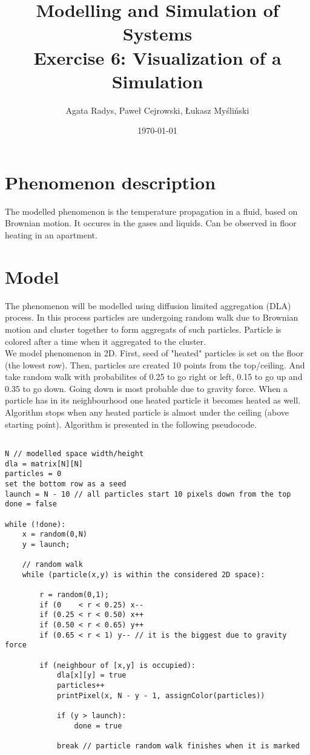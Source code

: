\documentclass[a4paper,10pt]{article}
\title{Modelling and Simulation of Systems\\ \Large
Exercise 6: Visualization of a Simulation}
\author{Agata Radys, Paweł Cejrowski, Łukasz Myśliński}
\date{\today}
\begin{document}
\maketitle

\section*{Phenomenon description}
The modelled phenomenon is the temperature propagation in a fluid, based on Brownian motion. It occures in the gases and
liquids. Can be observed in floor heating in an apartment.
\section*{Model}
The phenomenon will be modelled using diffusion limited aggregation (DLA) process. In this process particles are undergoing
random walk due to Brownian motion and cluster together to form aggregats of such particles. Particle is colored after a time
when it aggregated to the cluster.
\\
We model phenomenon in 2D. First, seed of "heated" particles is set on the floor (the lowest row). Then, particles are created
10 points from the top/ceiling. And take random walk with probabilites of 0.25 to go right or left, 0.15 to go up and 0.35 to go down.
Going down is most probable due to gravity force. When a particle has in its neighbourhood one heated particle it becomes heated as well.
Algorithm stops when any heated particle is almost under the ceiling (above starting point). Algorithm is presented in the following pseudocode.

\begin{lstlisting}[]

N // modelled space width/height
dla = matrix[N][N]
particles = 0
set the bottom row as a seed
launch = N - 10 // all particles start 10 pixels down from the top
done = false

while (!done):
    x = random(0,N)
    y = launch;

    // random walk
    while (particle(x,y) is within the considered 2D space):

        r = random(0,1);
        if (0    < r < 0.25) x--
        if (0.25 < r < 0.50) x++
        if (0.50 < r < 0.65) y++
        if (0.65 < r < 1) y-- // it is the biggest due to gravity force

        if (neighbour of [x,y] is occupied):
            dla[x][y] = true
            particles++
            printPixel(x, N - y - 1, assignColor(particles))

            if (y > launch):
                done = true

            break // particle random walk finishes when it is marked
\end{lstlisting}
\end{document}
